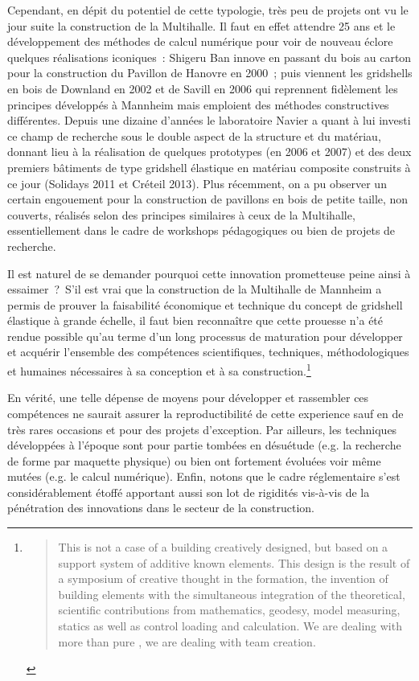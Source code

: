 Cependant, en dépit du potentiel de cette typologie, très peu de projets ont vu le jour suite la construction de la Multihalle. Il faut en effet attendre 25 ans et le développement des méthodes de calcul numérique pour voir de nouveau éclore quelques réalisations iconiques~: Shigeru Ban innove en passant du bois au carton pour la construction du Pavillon de Hanovre en 2000~; puis viennent les gridshells en bois de Downland en 2002 et de Savill en 2006 qui reprennent fidèlement les principes développés à Mannheim mais emploient des méthodes constructives différentes. Depuis une dizaine d'années le laboratoire Navier a quant à lui investi ce champ de recherche sous le double aspect de la structure et du matériau, donnant lieu à la réalisation de quelques prototypes (en 2006 et 2007) et des deux premiers bâtiments de type gridshell élastique en matériau composite construits à ce jour (Solidays 2011 et Créteil 2013). Plus récemment, on a pu observer un certain engouement pour la construction de pavillons en bois de petite taille, non couverts, réalisés selon des principes similaires à ceux de la Multihalle, essentiellement dans le cadre de workshops pédagogiques ou bien de projets de recherche.

Il est naturel de se demander pourquoi cette innovation prometteuse peine ainsi à essaimer~?~S'il est vrai que la construction de la Multihalle de Mannheim a permis de prouver la faisabilité économique et technique du concept de gridshell élastique à grande échelle, il faut bien reconnaître que cette prouesse n'a été rendue possible qu'au terme d'un long processus de maturation pour développer et acquérir l'ensemble des compétences scientifiques, techniques, méthodologiques et humaines nécessaires à sa conception et à sa construction.\footnote{\blockcquote[Georg Lewenton][p.~201]{IL13}{This is not a case of a building creatively designed, but based on a support system of additive known elements. This design is the result of a symposium of creative thought in the formation, the invention of building elements with the simultaneous integration of the theoretical, scientific contributions from mathematics, geodesy, model measuring, statics as well as control loading and calculation. We are dealing with more than pure , we are dealing with team creation.}}

En vérité, une telle dépense de moyens pour développer et rassembler ces compétences ne saurait assurer la reproductibilité de cette experience sauf en de très rares occasions et pour des projets d'exception. Par ailleurs, les techniques développées à l'époque sont pour partie tombées en désuétude (e.g. la recherche de forme par maquette physique) ou bien ont fortement évoluées voir même mutées (e.g. le calcul numérique). Enfin, notons que le cadre réglementaire s'est considérablement étoffé apportant aussi son lot de rigidités vis-à-vis de la pénétration des innovations dans le secteur de la construction.

